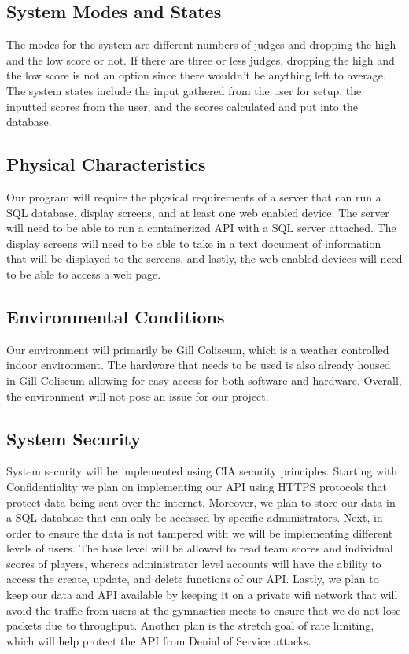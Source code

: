 \documentclass[letterpaper,10pt,draftclsnofoot,onecolumn,]{article}
\begin{document}
\subsection{System Modes and States}
The modes for the system are different numbers of judges and dropping the high and the low score or not. If there are three or less judges, dropping the high and the low score is not an option since there wouldn't be anything left to average. The system states include the input gathered from the user for setup, the inputted scores from the user, and the scores calculated and put into the database.\\

\subsection{Physical Characteristics}
Our program will require the physical requirements of a server that can run a SQL database, display screens, and at least one web enabled device. The server will need to be able to run a containerized API with a SQL server attached. The display screens will need to be able to take in a text document of information that will be displayed to the screens, and lastly, the web enabled devices will need to be able to access a web page.

\subsection{Environmental Conditions}
Our environment will primarily be Gill Coliseum, which is a weather controlled indoor environment. The hardware that needs to be used is also already housed in Gill Coliseum allowing for easy access for both software and hardware. Overall, the environment will not pose an issue for our project.

\subsection{System Security}
System security will be implemented using CIA security principles. Starting with Confidentiality we plan on implementing our API using HTTPS protocols that protect data being sent over the internet. Moreover, we plan to store our data in a SQL database that can only be accessed by specific administrators. Next, in order to ensure the data is not tampered with we will be implementing different levels of users. The base level will be allowed to read team scores and individual scores of players, whereas administrator level accounts will have the ability to access the create, update, and delete functions of our API. Lastly, we plan to keep our data and API available by keeping it on a private wifi network that will avoid the traffic from users at the gymnastics meets to ensure that we do not lose packets due to throughput. Another plan is the stretch goal of rate limiting, which will help protect the API from Denial of Service attacks.
\end{document}
